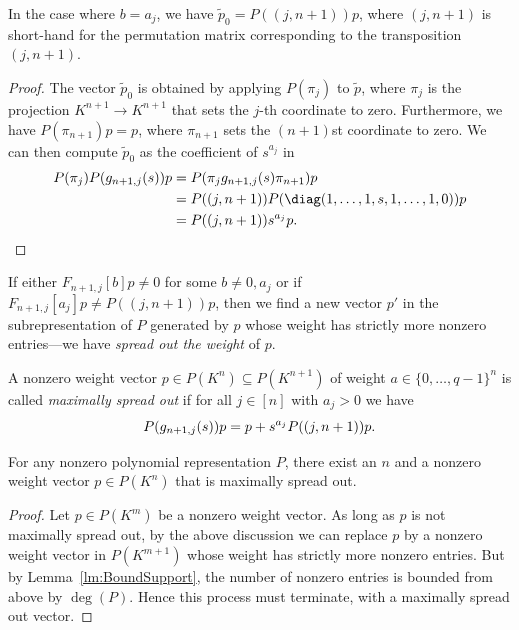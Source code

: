 \documentclass{amsart}
\begin{document}
\begin{lm} \label{lm:Swap}
In the case where $b=a_j$, we have $\tilde{p}_0=P((j,n+1))
p$, where $(j,n+1)$ is short-hand for the permutation matrix corresponding
to the transposition $(j,n+1)$. 
\end{lm}

\begin{proof}
The vector $\tilde{p}_0$ is obtained by applying $P(\pi_j)$ to
$\tilde{p}$, where $\pi_j$ is the projection $K^{n+1} \to K^{n+1}$
that sets the $j$-th coordinate to zero. Furthermore, we have
$P(\pi_{n+1})p=p$, where $\pi_{n+1}$ sets the $(n+1)$st coordinate to
zero. We can then compute $\tilde{p}_0$ as the coefficient of $s^{a_j}$ in
\begin{align*} 
P(\pi_j) P(g_{n+1,j}(s)) p &= P(\pi_j g_{n+1,j}(s)
\pi_{n+1}) p\\ 
&= P((j,n+1))P(\diag(1,\ldots,1,s,1,\ldots,1,0)) p \\
&= P((j,n+1))s^{a_j} p.  \qedhere
\end{align*}
\end{proof}

If either $F_{n+1,j}[b] p \neq 0$ for some $b \neq 0,a_j$ or if
$F_{n+1,j}[a_j]p \neq P((j,n+1)) p$, then we find a new vector $p'$ in
the subrepresentation of $P$ generated by $p$ whose weight has strictly more
nonzero entries---we have {\em spread out the weight} of $p$.

\begin{de}
A nonzero weight vector $p \in P(K^n) \subseteq P(K^{n+1})$
of weight $a \in \{0,\ldots,q-1\}^n $ is called 
{\em maximally spread out} if for all $j \in [n]$
with $a_j>0$ we have
\[ P(g_{n+1,j}(s)) p = p + s^{a_j} P((j,n+1)) p. \qedhere \]
\end{de}

\begin{prop} \label{prop:MaxSpread}
For any nonzero polynomial representation $P$, there exist an $n$ and a nonzero
weight vector $p \in P(K^n)$ that is maximally spread out.
\end{prop}

\begin{proof}
Let $p \in P(K^m)$ be a nonzero weight vector. As long as $p$ is not
maximally spread out, by the above discussion we can replace $p$ by a
nonzero weight vector in $P(K^{m+1})$ whose weight has strictly more nonzero
entries. But by Lemma~\ref{lm:BoundSupport}, the number of
nonzero entries is bounded from above by $\deg(P)$. Hence
this process must terminate, with a maximally spread out
vector. 
\end{proof}
\end{document}
